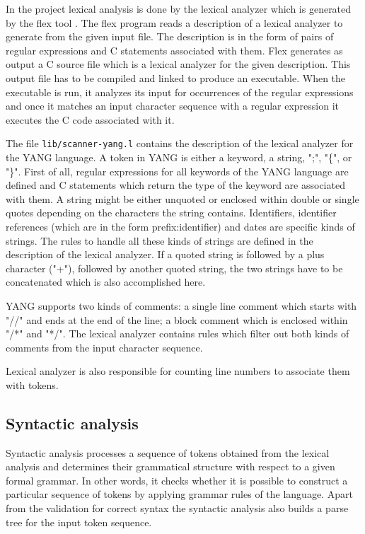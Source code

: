 \documentclass[conference]{IEEEtran}
\begin{document}
In the project lexical analysis is done by the lexical analyzer which is generated by the flex tool \cite{bib5}. The flex program reads a description of a lexical analyzer to generate from the given input file. The description is in the form of pairs of regular expressions and C statements associated with them. Flex generates as output a C source file which is a lexical analyzer for the given description. This output file has to be compiled and linked to produce an executable. When the executable is run, it analyzes its input for occurrences of the regular expressions and once it matches an input character sequence with a regular expression it executes the C code associated with it.

The file \texttt{lib/scanner-yang.l} contains the description of the lexical analyzer for the YANG language. A token in YANG is either a keyword, a string, ";", "\{", or "\}". First of all, regular expressions for all keywords of the YANG language are defined and C statements which return the type of the keyword are associated with them. A string might be either unquoted  or enclosed within double or single quotes depending on the characters the string contains. Identifiers, identifier references (which are in the form prefix:identifier) and dates  are specific kinds of strings. The rules to handle all these kinds of strings are defined in the description of the lexical analyzer. If a quoted string is followed by a plus character ("+"), followed by
 another quoted string, the two strings have to be concatenated which is also accomplished here.

YANG supports two kinds of comments: a single line comment which starts with "//" and  ends at the end of the line; a block comment which is enclosed within "/*"  and "*/". The lexical analyzer contains rules which filter out both kinds of comments from the input character sequence.

Lexical analyzer is also responsible for counting line numbers to associate them with tokens.

\subsection{Syntactic analysis}
Syntactic analysis processes a sequence of tokens obtained from the lexical analysis and determines their grammatical structure with respect to a given formal grammar. In other words, it checks whether it is possible to construct a particular sequence of tokens by applying grammar rules of the language. Apart from the validation for correct syntax the syntactic analysis also builds a parse tree for the input token sequence. 
\end{document}
